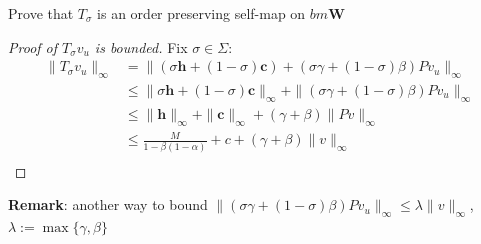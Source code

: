 \documentclass[aspectratio=169]{beamer} %
\begin{document}
\begin{frame}{Prove that $T_\sigma$ is an order preserving self-map on $bm\mathbf{W}$}
\begin{proof}[Proof of $T_\sigma v_u$ is bounded]
   Fix $\sigma\in\Sigma$:
    \begin{align*}
        \|T_\sigma v_u\|_\infty &= \|(\sigma \mathbf{h}+(1-\sigma )\mathbf{c}) + (\sigma \gamma+(1-\sigma)\beta)Pv_u\|_\infty\\
        &\le \|\sigma \mathbf{h}+(1-\sigma )\mathbf{c}\|_\infty + \|(\sigma \gamma+(1-\sigma)\beta)Pv_u\|_\infty \tag{$\Delta$ ineq.}\\
        &\le \|\mathbf{h}\|_\infty +\|\mathbf{c}\|_\infty  + (\gamma+\beta)\|Pv\|_\infty \tag{$\Delta$ ineq.}\\
        &\le \frac{M}{1-\beta(1-\alpha)} + c+ (\gamma+\beta)\|v\|_\infty\tag{$\|P\|=1$}\\
    \end{align*}
\end{proof}
\textbf{Remark}: another way to bound $\|(\sigma \gamma+(1-\sigma)\beta)Pv_u\|_\infty\le \lambda \|v\|_\infty$, $\lambda:=\max\{\gamma,\beta\}$
\end{frame}
\end{document}
